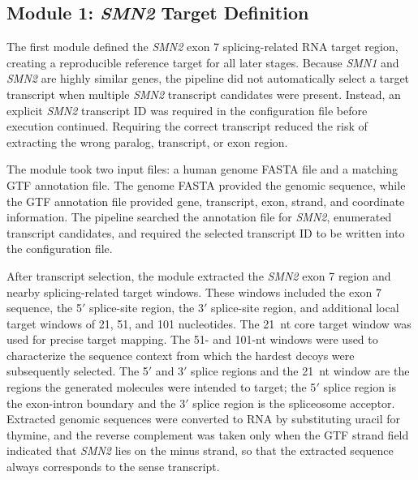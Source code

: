 \documentclass[journal]{IEEEtran}
\begin{document}
\subsection{Module 1: \textit{SMN2} Target Definition}

The first module defined the \textit{SMN2} exon 7 splicing-related RNA
target region, creating a reproducible reference target for all later
stages. Because \textit{SMN1} and \textit{SMN2} are highly similar
genes, the pipeline did not automatically select a target transcript
when multiple \textit{SMN2} transcript candidates were present. Instead,
an explicit \textit{SMN2} transcript ID was required in the
configuration file before execution continued. Requiring the correct
transcript reduced the risk of extracting the wrong paralog, transcript,
or exon region.

The module took two input files: a human genome FASTA file and a
matching GTF annotation file. The genome FASTA provided the genomic
sequence, while the GTF annotation file provided gene, transcript, exon,
strand, and coordinate information. The pipeline searched the annotation
file for \textit{SMN2}, enumerated transcript candidates, and required
the selected transcript ID to be written into the configuration file.

After transcript selection, the module extracted the \textit{SMN2} exon
7 region and nearby splicing-related target windows. These windows
included the exon 7 sequence, the 5$'$ splice-site region, the 3$'$
splice-site region, and additional local target windows of 21, 51, and
101 nucleotides. The 21~nt core target window was used for precise
target mapping. The 51- and 101-nt windows were used to characterize the
sequence context from which the hardest decoys were subsequently
selected. The 5$'$ and 3$'$ splice regions and the 21~nt window are the
regions the generated molecules were intended to target; the 5$'$ splice
region is the exon-intron boundary and the 3$'$ splice region is the
spliceosome acceptor. Extracted genomic sequences were converted to RNA
by substituting uracil for thymine, and the reverse complement was taken
only when the GTF strand field indicated that \textit{SMN2} lies on the
minus strand, so that the extracted sequence always corresponds to the
sense transcript.
\end{document}

